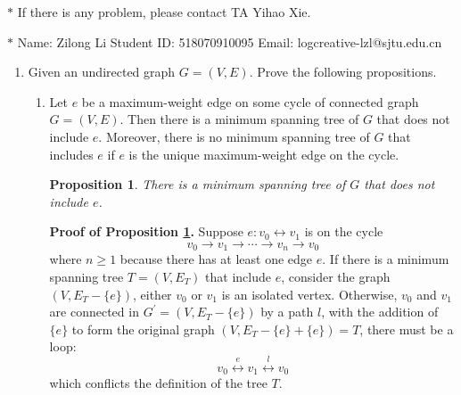 \documentclass[12pt,a4paper]{article}
\newtheorem{proposition}[theorem]{Proposition}
\theoremstyle{definition}
\begin{document}
\noindent

\noindent{}
\begin{center}
\footnotesize{\color{red}$*$ If there is any problem, please contact TA Yihao Xie. }

\footnotesize{\color{blue}$*$ Name: Zilong Li  \quad Student ID: 518070910095 \quad Email: logcreative-lzl@sjtu.edu.cn}
\end{center}

\begin{enumerate}

	\item Given an undirected graph $G = (V, E)$. Prove the following propositions.
	
	\begin{enumerate}
		\item Let $e$ be a maximum-weight edge on some cycle of connected graph $G=(V,E)$.
        Then there is a minimum spanning tree of $G$ that does not include $e$. Moreover, there is no minimum spanning tree of $G$ that includes $e$ if $e$ is the unique maximum-weight edge on the cycle. 
            \begin{proposition}\label{prop:ni}
                There is a minimum spanning tree of $G$ that does not include $e$.
            \end{proposition}
            \textbf{Proof of Proposition \ref{prop:ni}.} Suppose $e:v_0\leftrightarrow v_1$ is on the cycle 
            \begin{equation*}
                v_0\rightarrow v_1\rightarrow \cdots\rightarrow v_n\rightarrow v_0
            \end{equation*}
            where $n\geq 1$ because there has at least one edge $e$. If there is a minimum spanning tree $T=(V,E_T)$ that include $e$, consider the graph $(V,E_T-\{e\})$, either $v_0$ or $v_1$ is an isolated vertex. Otherwise, $v_0$ and $v_1$ are connected in $G^\prime =(V,E_T-\{e\})$ by a path $l$, with the addition of $\{e\}$ to form the original graph $(V,E_T-\{e\}+\{e\})=T$, there must be a loop:
            \begin{equation*}
                v_0 \stackrel{e}{\longleftrightarrow} v_{1} \stackrel{l}{\longleftrightarrow} v_0
            \end{equation*}
            which conflicts the definition of the tree $T$.


\end{enumerate}
\end{enumerate}
\end{document}
